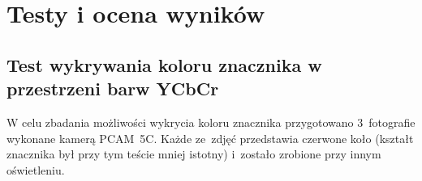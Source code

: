 \chapter{Testy i ocena wyników}
\label{cha:testy_i_ocena_wynikow}

\section{Test wykrywania koloru znacznika w przestrzeni barw YCbCr} 
\label{sec:test_wykrywania_koloru_znacznika_w_przestrzeni_barw_ycbcr}


W celu zbadania możliwości wykrycia koloru znacznika przygotowano 3~fotografie wykonane kamerą PCAM~5C. 
Każde ze~zdjęć przedstawia czerwone koło (kształt znacznika był przy tym teście mniej istotny) i~zostało zrobione przy innym oświetleniu.\\

